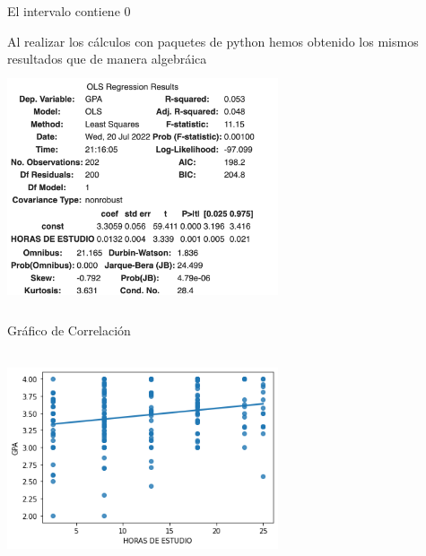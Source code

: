 \documentclass[12pt]{article}
\begin{document}
El intervalo contiene 0

Al realizar los cálculos con paquetes de python hemos obtenido los mismos resultados que de manera algebráica\\
\includegraphics[width=8cm, height=7cm]{resultados}

Gráfico de Correlación\\
\includegraphics[width=8cm, height=7cm]{regresion}
\end{document}
